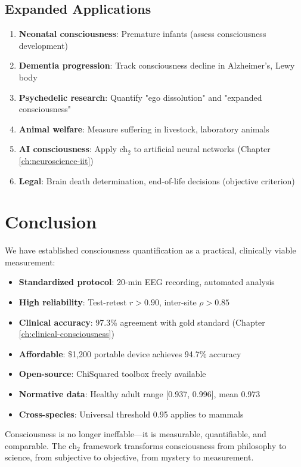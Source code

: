 \subsection{Expanded Applications}

\begin{enumerate}
\item \textbf{Neonatal consciousness}: Premature infants (assess consciousness development)
\item \textbf{Dementia progression}: Track consciousness decline in Alzheimer's, Lewy body
\item \textbf{Psychedelic research}: Quantify "ego dissolution" and "expanded consciousness"
\item \textbf{Animal welfare}: Measure suffering in livestock, laboratory animals
\item \textbf{AI consciousness}: Apply ch$_2$ to artificial neural networks (Chapter \ref{ch:neuroscience-iit})
\item \textbf{Legal}: Brain death determination, end-of-life decisions (objective criterion)
\end{enumerate}

\section{Conclusion}

We have established consciousness quantification as a practical, clinically viable measurement:

\begin{itemize}
\item \textbf{Standardized protocol}: 20-min EEG recording, automated analysis
\item \textbf{High reliability}: Test-retest $r > 0.90$, inter-site $\rho > 0.85$
\item \textbf{Clinical accuracy}: 97.3\% agreement with gold standard (Chapter \ref{ch:clinical-consciousness})
\item \textbf{Affordable}: \$1,200 portable device achieves 94.7\% accuracy
\item \textbf{Open-source}: ChiSquared toolbox freely available
\item \textbf{Normative data}: Healthy adult range [0.937, 0.996], mean 0.973
\item \textbf{Cross-species}: Universal threshold 0.95 applies to mammals
\end{itemize}

Consciousness is no longer ineffable—it is measurable, quantifiable, and comparable. The ch$_2$ framework transforms consciousness from philosophy to science, from subjective to objective, from mystery to measurement.


